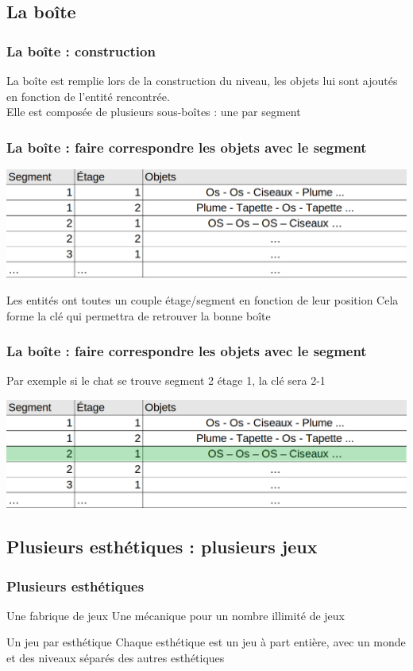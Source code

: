 \documentclass{beamer}
\begin{document}
\subsection{La boîte}
\begin{frame}
\frametitle{La boîte : construction}
La boîte est remplie lors de la construction du niveau, les objets lui sont ajoutés en fonction de l'entité rencontrée. \\
Elle est composée de plusieurs sous-boîtes : une par segment


\end{frame}

\begin{frame}
\frametitle{La boîte : faire correspondre les objets avec le segment}


\begin{center}
\includegraphics[scale=0.2]{images/boite.png}
\end{center}

Les entités ont toutes un couple étage/segment en fonction de leur position
Cela forme la clé qui permettra de retrouver la bonne boîte
\end{frame}

\begin{frame}
\frametitle{La boîte : faire correspondre les objets avec le segment}
Par exemple si le chat se trouve segment 2 étage 1, la clé sera 2-1
\begin{center}
\includegraphics[scale=0.2]{images/boite_selected.png}
\end{center}
\end{frame}

\subsection{Plusieurs esthétiques : plusieurs jeux}
\begin{frame}
\frametitle{Plusieurs esthétiques}

\begin{block}{Une fabrique de jeux}
Une mécanique pour un nombre illimité de jeux
\end{block}

\begin{block}{Un jeu par esthétique}
Chaque esthétique est un jeu à part entière, avec un monde et des niveaux séparés des autres esthétiques
\end{block}
\end{frame}
\end{document}
